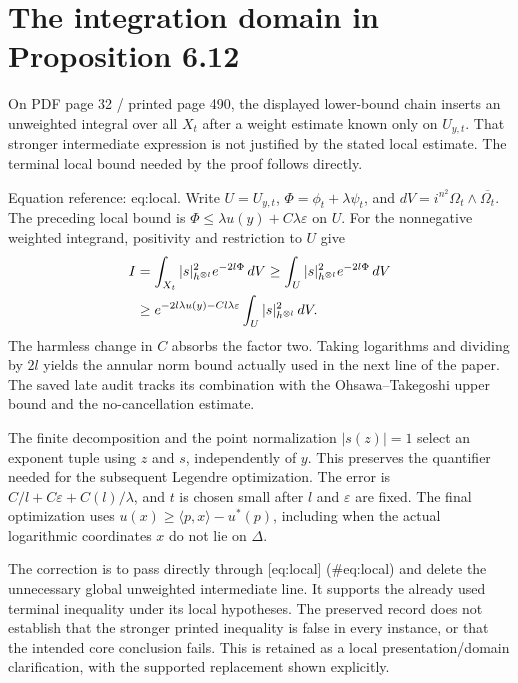 \documentclass[10pt]{article}
\begin{document}
\section*{The integration domain in Proposition 6.12}
On PDF page 32 / printed page 490, the displayed lower-bound chain inserts an unweighted integral over all \(X_t\) after a weight estimate known only on \(U_{y,t}\). That stronger intermediate expression is not justified by the stated local estimate. The terminal local bound needed by the proof follows directly.\par
Equation reference: eq:local. Write \(U=U_{y,t}\), \(\Phi=\phi_t+\lambda\psi_t\), and \(dV=i^{n^2}\Omega_t\wedge\overline{\Omega_t}\). The preceding local bound is \(\Phi\leq\lambda u(y)+C\lambda\varepsilon\) on \(U\). For the nonnegative weighted integrand, positivity and restriction to \(U\) give \[\begin{aligned}
 I&=\int_{X_t}|s|_{h^{\otimes l}}^2e^{-2l\Phi}\,dV
       \geq\int_U |s|_{h^{\otimes l}}^2e^{-2l\Phi}\,dV \notag\\
  &\geq e^{-2l\lambda u(y)-Cl\lambda\varepsilon}
          \int_U |s|_{h^{\otimes l}}^2\,dV .\end{aligned}\] The harmless change in \(C\) absorbs the factor two. Taking logarithms and dividing by \(2l\) yields the annular norm bound actually used in the next line of the paper. The saved late audit tracks its combination with the Ohsawa–Takegoshi upper bound and the no-cancellation estimate.\par
The finite decomposition and the point normalization \(|s(z)|=1\) select an exponent tuple using \(z\) and \(s\), independently of \(y\). This preserves the quantifier needed for the subsequent Legendre optimization. The error is \(C/l+C\varepsilon+C(l)/\lambda\), and \(t\) is chosen small after \(l\) and \(\varepsilon\) are fixed. The final optimization uses \(u(x)\geq\langle p,x\rangle-u^*(p)\), including when the actual logarithmic coordinates \(x\) do not lie on \(\Delta\).\par
The correction is to pass directly through [eq:local] (\#eq:local) and delete the unnecessary global unweighted intermediate line. It supports the already used terminal inequality under its local hypotheses. The preserved record does not establish that the stronger printed inequality is false in every instance, or that the intended core conclusion fails. This is retained as a local presentation/domain clarification, with the supported replacement shown explicitly.\par
\end{document}
